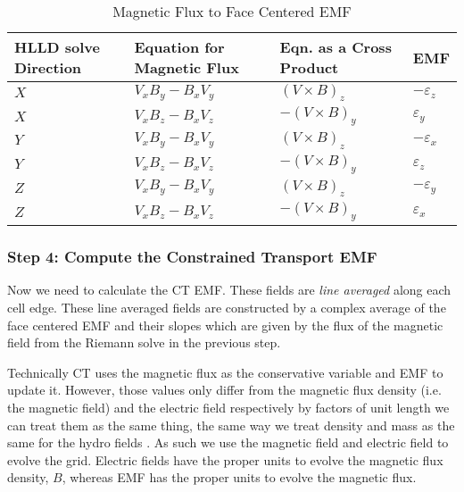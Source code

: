 \begin{table}[!ht]
    \centering
        \caption{Magnetic Flux to Face Centered EMF}
    \begin{tabular}{|l|l|l|l|}
    \hline
        HLLD solve Direction & Equation for Magnetic Flux & Eqn. as a Cross Product & EMF \\ \hline
        $ X $ & $ V_x B_y - B_x V_y $ & $  (V \times B)_z $ & $ -\varepsilon_z $ \\ \hline
        $ X $ & $ V_x B_z - B_x V_z $ & $ -(V \times B)_y $ & $  \varepsilon_y $ \\ \hline
        $ Y $ & $ V_x B_y - B_x V_y $ & $  (V \times B)_z $ & $ -\varepsilon_x $ \\ \hline
        $ Y $ & $ V_x B_z - B_x V_z $ & $ -(V \times B)_y $ & $  \varepsilon_z $ \\ \hline
        $ Z $ & $ V_x B_y - B_x V_y $ & $  (V \times B)_z $ & $ -\varepsilon_y $ \\ \hline
        $ Z $ & $ V_x B_z - B_x V_z $ & $ -(V \times B)_y $ & $  \varepsilon_x $ \\ \hline
    \end{tabular}
    \label{table:emf}
\end{table}

\subsubsection{Step 4: Compute the Constrained Transport EMF}
\label{vlct:emf}

Now we need to calculate the CT EMF. These fields are \emph{line averaged} along each cell edge. These line averaged fields are constructed by a complex average of the face centered EMF and their slopes which are given by the flux of the magnetic field from the Riemann solve in the previous step.

Technically CT uses the magnetic flux as the conservative variable and EMF to update it. However, those values only differ from the magnetic flux density (i.e. the magnetic field) and the electric field respectively by factors of unit length we can treat them as the same thing, the same way we treat density and mass as the same for the hydro fields \cite{stone_athena_2008}. As such we use the magnetic field and electric field to evolve the grid. Electric fields have the proper units to evolve the magnetic flux density, $ B $, whereas EMF has the proper units to evolve the magnetic flux.

